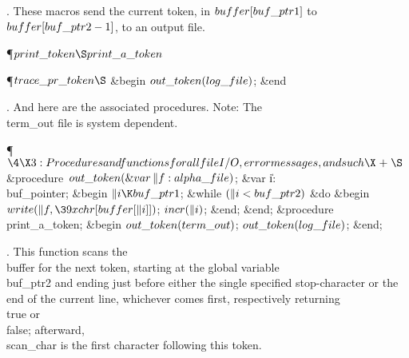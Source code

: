 .
These macros send the current token, in $\\{buffer}[\\{buf\_ptr1}]$ to
$\\{buffer}[\\{buf\_ptr2}-1]$, to an output file.

\Y\P\D {}$\\{print\_token}\S\\{print\_a\_token}$\Y\par
\P\D {}$\\{trace\_pr\_token}\S$\1\6
\&{begin} $\\{out\_token}(\\{log\_file})$;\6
\&{end}\2\par
\fi

.
And here are the associated procedures.  Note: The \\{term\_out} file is
system dependent.

\Y\P$\4\X3:Procedures and functions for all file I/O, error messages, and such%
\X\mathrel{+}\S$\6
\4\&{procedure}\1\  $\\{out\_token}(\mathop{\&{var}}\|f:\\{alpha\_file})$;\6
\4\&{var} \|i: \\{buf\_pointer};\2\6
\&{begin} $\|i\K\\{buf\_ptr1}$;\6
\&{while} $(\|i<\\{buf\_ptr2})$ \1\&{do}\6
\&{begin} $\\{write}(\|f,\39\\{xchr}[\\{buffer}[\|i]])$;\5
$\\{incr}(\|i)$;\6
\&{end};\2\6
\&{end};\7
\4\&{procedure}\1\  \\{print\_a\_token};\2\6
\&{begin} $\\{out\_token}(\\{term\_out})$;\5
$\\{out\_token}(\\{log\_file})$;\6
\&{end};\par
\fi

.
This function scans the \\{buffer} for the next token, starting at the
global variable \\{buf\_ptr2} and ending just before either the single
specified stop-character or the end of the current line, whichever
comes first, respectively returning \\{true} or \\{false}; afterward,
\\{scan\_char} is the first character following this token.

